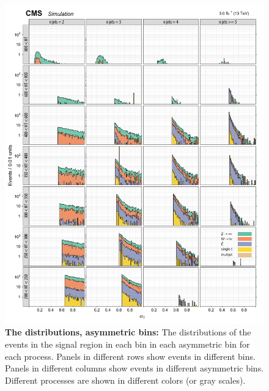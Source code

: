 \begin{figure}[!h]
\centering
\includegraphics[scale=0.95]{figures/kiplots/c150107_s150318_f015_alphaT_40}
\caption{\textbf{\boldmath The \alphat distributions, asymmetric \njet
bins:} The \alphat distributions of the events in the signal region in
each \scalht bin in each asymmetric \njet bin for each process. Panels
in different rows show events in different \scalht bins. Panels in
different columns show events in different asymmetric \njet bins.
Different processes are shown in different colors (or gray scales).}
\label{c150107_s150318_f015_alphaT_40}
\end{figure}

